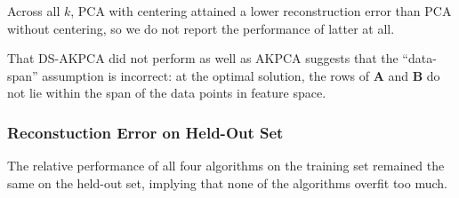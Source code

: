 \documentclass[]{article}
\begin{document}
Across all $k$, PCA with centering attained a lower reconstruction error than PCA without centering, so we do not report the performance of latter at all.

That DS-AKPCA did not perform as well as AKPCA suggests that the ``data-span'' assumption is incorrect: at the optimal solution, the rows of $\mathbf{A}$ and $\mathbf{B}$ do not lie within the span of the data points in feature space.


\subsubsection{Reconstuction Error on Held-Out Set}

The relative performance of all four algorithms on the training set remained the same on the held-out set, implying that none of the algorithms overfit too much.
\end{document}
